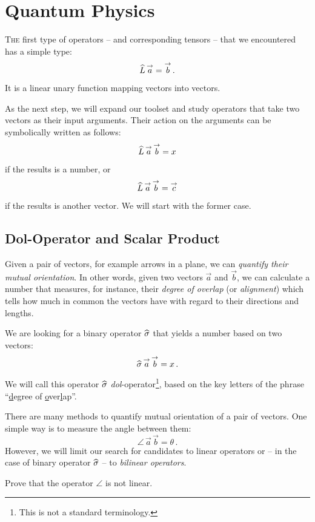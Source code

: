 \graphicspath{{../05QuantumPhysics/pics/}}

\chapter{Quantum Physics}\label{ch:QuantumPhysics}
\lettrine[lines=2]{\color{darkocre}T}{he} first type of operators -- and
corresponding tensors -- that we encountered has a simple type:
\[
\widehat{L}\,\overset{\rightarrow}{a} = \overset{\rightarrow}{b}\,.
\]
It is a linear unary function mapping vectors into vectors.

As the next step, we will expand our toolset and study operators that take
two vectors as their input arguments. Their action on the arguments
can be symbolically written as follows:
\[
\widehat{L}\,\overset{\rightarrow}{a}\,\overset{\rightarrow}{b} = x
\]
if the results is a number, or
\[
\widehat{L}\,\overset{\rightarrow}{a}\,\overset{\rightarrow}{b} = \overset{\rightarrow}{c}
\]
if the results is another vector. We will start with the former case.


\section{Dol-Operator and Scalar Product}\label{sec:Dol}

Given a pair of vectors, for example arrows in a plane, we can
\emph{quantify their mutual orientation}. In other words, given two
vectors $\vec{a}$ and
$\vec{b}$, we can calculate a number that measures, for instance,
their \emph{degree of overlap} (or
\emph{alignment}) which tells how
much in common the vectors have with regard to their directions and
lengths.

We are looking for a binary operator $\widehat{\sigma}$ that yields a number
based on two vectors:
\[
\widehat{\sigma}\,\overset{\rightarrow}{a}\,\overset{\rightarrow}{b}=x\,.
\]
We will call this operator $\widehat{\sigma}$ \emph{dol}-operator\footnote{This is not a
standard terminology. }, based on the key letters of the phrase
``\underline{d}egree of \underline{o}ver\underline{l}ap''.

There are many methods to quantify mutual orientation of a pair
of vectors. One simple way is to measure the angle between them:
\[
\angle\,\vec{a}\,\vec{b} = \theta\,.
\]
However, we will limit our search for candidates to linear operators
or -- in the case of binary operator $\widehat{\sigma}$ -- to \emph{bilinear
operators}.
\begin{exercise}\label{exe:angleOperatorNonlinear}
  Prove that the operator $\angle$ is not linear.
\end{exercise}

